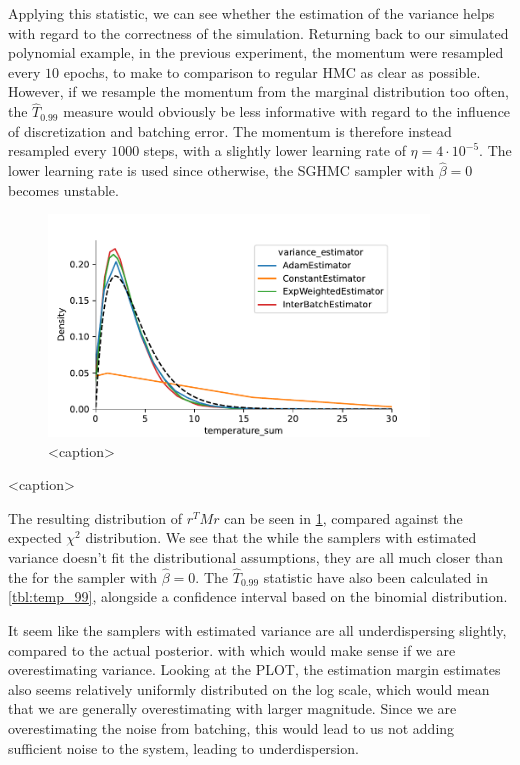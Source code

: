 Applying this statistic, we can see whether the estimation of the variance helps with regard to the correctness of the simulation. 
Returning back to our simulated polynomial example, in the previous experiment, the momentum were resampled every $10$ epochs, to make to comparison to regular HMC as clear as possible. 
However, if we resample the momentum from the marginal distribution too often, the $\hat{T}_{0.99}$ measure would obviously be less informative with regard to the influence of discretization and batching error. 
The momentum is therefore instead resampled every $1000$ steps, with a slightly lower learning rate of $\eta=4 \cdot 10^{-5}$.
The lower learning rate is used since otherwise, the SGHMC sampler with $\hat{\beta}=0$ becomes unstable. 
\begin{figure}[htb]
    \centering
    \includegraphics[width=0.9\textwidth]{Figures/temperature_sum_chi2_comp.pdf}
    \caption{<caption>}
    \label{fig:temperature_sum_chi2_comp}
\end{figure}
\begin{table}[htb]
    \centering
    
    \caption{<caption>}
    \label{tbl:temp_99}
\end{table}
The resulting distribution of $r^T M r$ can be seen in \cref{fig:temperature_sum_chi2_comp}, compared against the expected $\chi^2$ distribution. 
We see that the while the samplers with estimated variance doesn't fit the distributional assumptions, they are all much closer than the for the sampler with $\hat \beta = 0$.
The $\hat T_{0.99}$ statistic have also been calculated in \cref{tbl:temp_99}, alongside a confidence interval based on the binomial distribution.

It seem like the samplers with estimated variance are all underdispersing slightly, compared to the actual posterior. with  which would make sense if we are overestimating variance.
Looking at the PLOT, the estimation margin estimates also seems relatively uniformly distributed on the log scale, which would mean that we are generally overestimating with larger magnitude. 
Since we are overestimating the noise from batching, this would lead to us not adding sufficient noise to the system, leading to underdispersion.

